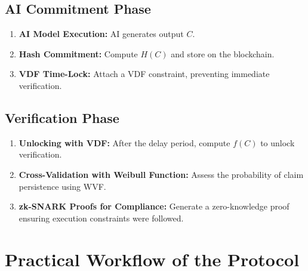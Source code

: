 \documentclass[12pt]{report}
\begin{document}
\subsection{AI Commitment Phase}
\begin{enumerate}
    \item \textbf{AI Model Execution:} AI generates output \( C \).
    \item \textbf{Hash Commitment:} Compute \( H(C) \) and store on the blockchain.
    \item \textbf{VDF Time-Lock:} Attach a VDF constraint, preventing immediate verification.
\end{enumerate}

\subsection{Verification Phase}
\begin{enumerate}
    \item \textbf{Unlocking with VDF:} After the delay period, compute \( f(C) \) to unlock verification.
    \item \textbf{Cross-Validation with Weibull Function:} Assess the probability of claim persistence using WVF.
    \item \textbf{zk-SNARK Proofs for Compliance:} Generate a zero-knowledge proof ensuring execution constraints were followed.
\end{enumerate}

\section{Practical Workflow of the Protocol}
\end{document}
